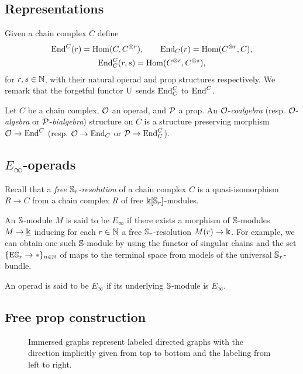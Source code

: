 \subsection{Representations}

Given a chain complex $C$ define
\begin{gather*}
\mathrm{End}^C(r) = \mathrm{Hom}(C, C^{\otimes r}), \qquad
\mathrm{End}_C(r) = \mathrm{Hom}(C^{\otimes r}, C), \\
\mathrm{End}^C_C(r, s) = \mathrm{Hom}(C^{\otimes r}, C^{\otimes s}),
\end{gather*}
for $r,s \in \mathbb{N}$, with their natural operad and prop structures respectively.
We remark that the forgetful functor $\operatorname{U}$ sends $\mathrm{End}^C_C$ to $\mathrm{End}^C$.

Let $C$ be a chain complex, $\mathcal{O}$ an operad, and $\mathcal{P}$ a prop.
An $\mathcal{O}$-\textit{coalgebra} (resp. $\mathcal{O}$-\textit{algebra} or $\mathcal{P}$-\textit{bialgebra}) structure on $C$ is a structure preserving morphism $\mathcal{O} \to \mathrm{End}^C$ (resp. $\mathcal{O} \to \mathrm{End}_C$ or $\mathcal{P} \to \mathrm{End}_C^C$).

\subsection{\texorpdfstring{${E_\infty}$}{E-infty}-operads}

Recall that a \textit{free $\mathbb{S}_r$-resolution} of a chain complex $C$ is a quasi-isomorphism $R \to C$ from a chain complex $R$ of free $\Bbbk[\mathbb{S}_r]$-modules.

An $\mathbb{S}$-module $M$ is said to be $E_\infty$ if there exists a morphism of $\mathbb{S}$-modules $M \to \underline{\Bbbk}$ inducing for each $r \in \mathbb{N}$ a free $\mathbb{S}_r$-resolution $M(r) \to \Bbbk$.
For example, we can obtain one such $\mathbb{S}$-module by using the functor of singular chains and the set $\{\mathrm{E} \mathbb{S}_r \to \ast\}_{n \in \mathbb{N}}$ of maps to the terminal space from models of the universal $\mathbb{S}_r$-bundle.

An operad is said to be $E_\infty$ if its underlying $\mathbb{S}$-module is $E_\infty$.

\subsection{Free prop construction} \label{ss:free prop}

\begin{figure}
	
	\caption{Immersed graphs represent labeled directed graphs with the direction implicitly given from top to bottom and the labeling from left to right.}
	\label{f:immersion}
\end{figure}

